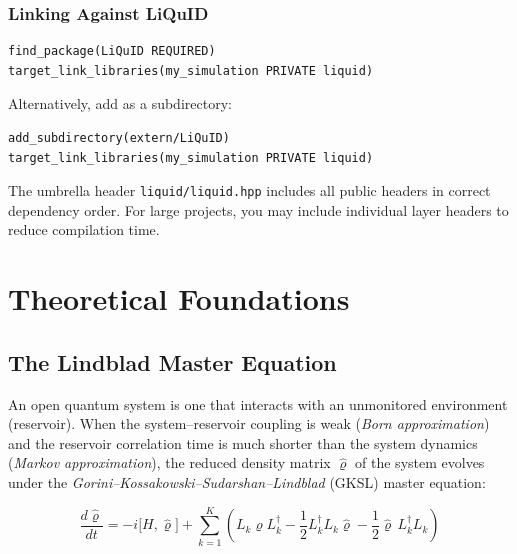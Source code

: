 \documentclass[11pt,a4paper,twoside]{book}
\newcommand{\densmat}{\hat{\varrho}}    %
\newcommand{\code}[1]{\texttt{\small#1}}
\theoremstyle{definition}
\theoremstyle{remark}
\begin{document}
\subsection{Linking Against LiQuID}
\label{subsec:linking}

\begin{verbatim}
find_package(LiQuID REQUIRED)
target_link_libraries(my_simulation PRIVATE liquid)
\end{verbatim}

Alternatively, add as a subdirectory:

\begin{verbatim}
add_subdirectory(extern/LiQuID)
target_link_libraries(my_simulation PRIVATE liquid)
\end{verbatim}

\begin{notebox}
  The umbrella header \code{liquid/liquid.hpp} includes all public
  headers in correct dependency order. For large projects, you may
  include individual layer headers to reduce compilation time.
\end{notebox}

\chapter{Theoretical Foundations}
\label{chap:theory}

\section{The Lindblad Master Equation}
\label{sec:lindblad-master}

An open quantum system is one that interacts with an unmonitored
environment (reservoir). When the system--reservoir coupling is weak
(\emph{Born approximation}) and the reservoir correlation time is much
shorter than the system dynamics (\emph{Markov approximation}), the
reduced density matrix $\densmat$ of the system evolves under the
\emph{Gorini--Kossakowski--Sudarshan--Lindblad} (GKSL) master equation:

\begin{equation}
  \boxed{
  \frac{d\densmat}{dt}
    = -i\bigl[H, \densmat\bigr]
      + \sum_{k=1}^{K} \left(
          L_k \densmat L_k^\dagger
          - \frac{1}{2} L_k^\dagger L_k \densmat
          - \frac{1}{2} \densmat\, L_k^\dagger L_k
        \right)
  }
  \label{eq:lindblad}
\end{equation}
\end{document}
